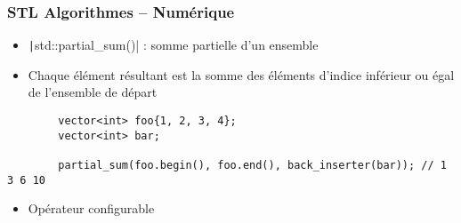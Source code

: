 \documentclass[C++.tex]{subfiles}
\begin{document}
\begin{frame}[fragile]
	\frametitle{STL Algorithmes -- Numérique}
	\begin{itemize}
		\item \texttt|std::partial_sum()| : \og somme\fg{} partielle d'un ensemble
		\item Chaque élément résultant est la somme des éléments d'indice inférieur ou égal de l'ensemble de départ
	\end{itemize}

	\begin{verbatim}
		vector<int> foo{1, 2, 3, 4};
		vector<int> bar;

		partial_sum(foo.begin(), foo.end(), back_inserter(bar)); // 1 3 6 10
	\end{verbatim}

	\begin{itemize}
		\item Opérateur configurable
	\end{itemize}

\end{frame}
\end{document}
